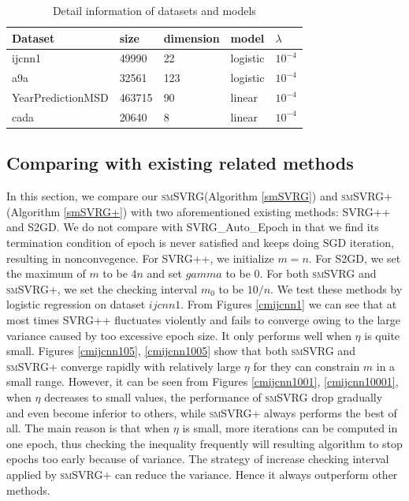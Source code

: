 \documentclass[conference]{IEEEtran}
\begin{document}
\begin{table}[]
\centering
\caption{Detail information of datasets and models}
\label{data information}
\begin{tabular}{|l|l|l|l|l|}
\hline
Dataset           & size & dimension & model & $\lambda$ \\ \hline
ijcnn1            &  49990 &  22 &   logistic    &  $10^{-4}$         \\
a9a               &   32561&123   &     logistic  &      $10^{-4}$     \\ 
YearPredictionMSD & 463715  &  90 &    linear  &      $10^{-4}$     \\
cada              & 20640  &8   &     linear  &    $10^{-4}$       \\ \hline
\end{tabular}
\end{table}



\subsection{Comparing with existing related methods}
In this section, we compare our \textsc{smSVRG}(Algorithm \ref{smSVRG}) and \textsc{smSVRG+}(Algorithm \ref{smSVRG+}) with two aforementioned existing methods: SVRG++ and S2GD. We do not compare with SVRG\_Auto\_Epoch in that we find its termination condition of epoch is never satisfied and keeps doing SGD iteration, resulting in nonconvegence. For SVRG++, we initialize $m = n$. For S2GD, we set the maximum of $m$ to be $4n$ and set $gamma$ to be $0$. For both \textsc{smSVRG} and \textsc{smSVRG+}, we set the checking interval $m_0$ to be $10/n$.
We test these methods by logistic regression on dataset $ijcnn1$. 
From Figures \ref{cmijcnn1} we can see that at most times SVRG++ fluctuates violently and fails to converge owing to the large variance caused by too excessive epoch size. It only performs well when $\eta$ is quite small.
Figures \ref{cmijcnn105}, \ref{cmijcnn1005} show that both \textsc{smSVRG} and \textsc{smSVRG+} converge rapidly with relatively large $\eta$ for they can constrain $m$ in a small range. However, it can be seen from Figures \ref{cmijcnn1001}, \ref{cmijcnn10001}, when $\eta$ decreases to small values, the performance of \textsc{smSVRG} drop gradually and even become inferior to others, while \textsc{smSVRG+} always performs the best of all. The main reason is that  when $\eta$ is small, more iterations can be computed in one epoch, thus checking the inequality frequently will resulting algorithm to stop epochs too early because of variance. The strategy of increase checking interval applied by \textsc{smSVRG+} can reduce the variance. Hence it always outperform other methods.
\end{document}
